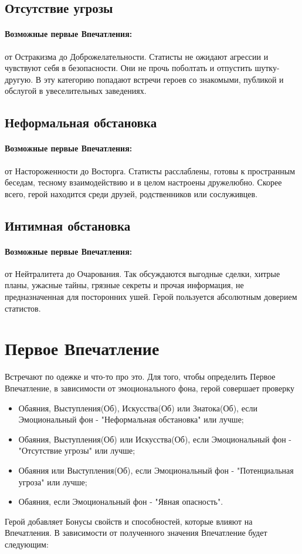 \subsection{Отсутствие угрозы}
\paragraph{Возможные первые Впечатления:} от Остракизма до Доброжелательности.
\newline Статисты не ожидают агрессии и чувствуют себя в безопасности. Они не прочь поболтать и отпустить шутку-другую. В эту категорию попадают встречи героев со знакомыми, публикой и обслугой в увеселительных заведениях.

\subsection{Неформальная обстановка}
\paragraph{Возможные первые Впечатления:} от Настороженности до Восторга.
\newline Статисты расслаблены, готовы к пространным беседам, тесному взаимодействию и в целом настроены дружелюбно. Скорее всего, герой находится среди друзей, родственников или сослуживцев.

\subsection{Интимная обстановка}
\paragraph{Возможные первые Впечатления:} от Нейтралитета до Очарования.
\newline Так обсуждаются выгодные сделки, хитрые планы, ужасные тайны, грязные секреты и прочая информация, не предназначенная для посторонних ушей. Герой пользуется абсолютным доверием статистов.

\section{Первое Впечатление}
 Встречают по одежке и что-то про это.
Для того, чтобы определить Первое Впечатление, в зависимости от эмоционального фона, герой совершает проверку
\begin{itemize}
  \item Обаяния, Выступления(Об), Искусства(Об) или Знатока(Об), если Эмоциональный фон - "Неформальная обстановка" или лучше;
  \item Обаяния, Выступления(Об) или Искусства(Об), если Эмоциональный фон - "Отсутствие угрозы" или лучше;
  \item Обаяния или Выступления(Об), если Эмоциональный фон - "Потенциальная угроза" или лучше;
  \item Обаяния, если Эмоциональный фон - "Явная опасность".
\end{itemize}
Герой добавляет Бонусы свойств и способностей, которые влияют на Впечатления.
В зависимости от полученного значения Впечатление будет следующим:
